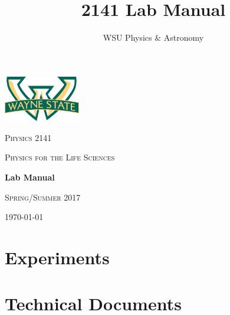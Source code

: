 \documentclass[hidelinks,12pt,letterpaper,twoside]{book}
\author{WSU Physics \& Astronomy}
\title{2141 Lab Manual}
\newcommand\blankpage{%
    \null
    \thispagestyle{empty}%
    \newpage}
\begin{document}
\begin{titlepage}
	\centering
	\includegraphics[width=0.25\textwidth]{wsu_logo}\par\vspace{1cm}
	{\scshape\LARGE Physics 2141 \par}
	\vspace{0.5cm}
	{\scshape\large Physics for the Life Sciences\par}
	\vfill
	\textbf{\huge Lab Manual} \par
	\vfill
	{\scshape\large Spring/Summer 2017 \par}
	{\scshape\large \today \par}
\end{titlepage}

\newpage{\blankpage}



\newpage{\blankpage}

\renewcommand\contentsname{Physics for the Life Sciences}
\setcounter{tocdepth}{1}
\tableofcontents{\thispagestyle{fancy}}

\newpage{\blankpage}

\part{Experiments}
\renewcommand{\chaptername}{Experiment}
\setcounter{chapter}{5}

\newpage{\blankpage}






\part{Technical Documents}
\renewcommand{\chaptername}{Technical Document}
\renewcommand\thechapter{\Alph{chapter}}
\newpage{\blankpage}
\newpage{\blankpage}
\newpage{\blankpage}
\newpage{\blankpage}
\end{document}
